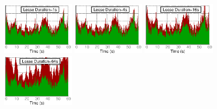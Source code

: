 \begin{figure}[t]
{    \includegraphics[width = 1.4in]{fig/jiffy/lease_duration_1}\hspace{-.5em}%
    \includegraphics[width = 1.4in]{fig/jiffy/lease_duration_4}\hspace{-.5em}%
    \includegraphics[width = 1.4in]{fig/jiffy/lease_duration_16}\hspace{-.5em}%
    \includegraphics[width = 1.4in]{fig/jiffy/lease_duration_64}
    \label{fig:lease-duration}
  }\vspace{-1em}
\end{figure}
